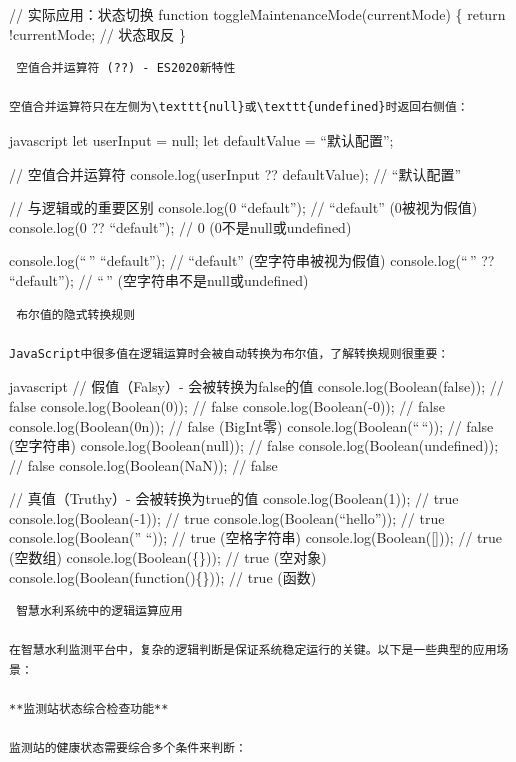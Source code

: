 // 实际应用：状态切换 function toggleMaintenanceMode(currentMode) \{ return !currentMode; // 状态取反 \}

\begin{lstlisting}
 空值合并运算符 (??) - ES2020新特性

空值合并运算符只在左侧为\texttt{null}或\texttt{undefined}时返回右侧值：
\end{lstlisting}

javascript let userInput = null; let defaultValue = ``默认配置'';

// 空值合并运算符 console.log(userInput ?? defaultValue); // ``默认配置''

// 与逻辑或的重要区别 console.log(0 \textbar\textbar{} ``default''); // ``default'' (0被视为假值) console.log(0 ?? ``default''); // 0 (0不是null或undefined)

console.log(``\,'' \textbar\textbar{} ``default''); // ``default'' (空字符串被视为假值) console.log(``\,'' ?? ``default''); // ``\,'' (空字符串不是null或undefined)

\begin{lstlisting}
 布尔值的隐式转换规则

JavaScript中很多值在逻辑运算时会被自动转换为布尔值，了解转换规则很重要：
\end{lstlisting}

javascript // 假值（Falsy）- 会被转换为false的值 console.log(Boolean(false)); // false console.log(Boolean(0)); // false console.log(Boolean(-0)); // false console.log(Boolean(0n)); // false (BigInt零) console.log(Boolean(``\,``)); // false (空字符串) console.log(Boolean(null)); // false console.log(Boolean(undefined)); // false console.log(Boolean(NaN)); // false

// 真值（Truthy）- 会被转换为true的值 console.log(Boolean(1)); // true console.log(Boolean(-1)); // true console.log(Boolean(``hello'')); // true console.log(Boolean('' ``)); // true (空格字符串) console.log(Boolean({[}{]})); // true (空数组) console.log(Boolean(\{\})); // true (空对象) console.log(Boolean(function()\{\})); // true (函数)

\begin{lstlisting}
 智慧水利系统中的逻辑运算应用

在智慧水利监测平台中，复杂的逻辑判断是保证系统稳定运行的关键。以下是一些典型的应用场景：

**监测站状态综合检查功能**

监测站的健康状态需要综合多个条件来判断：
\end{lstlisting}

